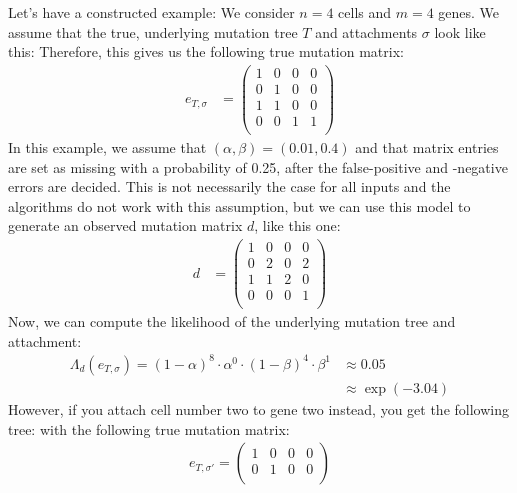 \begin{example}
    \label{exmpl:scite_problem}
    Let's have a constructed example: We consider $n = 4$ cells and $m = 4$ genes. We assume that the true, underlying mutation tree $T$ and attachments $\sigma$ look like this:
    Therefore, this gives us the following true mutation matrix:
    \begin{align*}
        e_{T, \sigma} &= \begin{pmatrix}
            1 & 0 & 0 & 0 \\
            0 & 1 & 0 & 0 \\
            1 & 1 & 0 & 0 \\
            0 & 0 & 1 & 1 \\
        \end{pmatrix}
    \end{align*}
    In this example, we assume that $(\alpha, \beta) = (0.01, 0.4)$ and that matrix entries are set as missing with a probability of 0.25, after the false-positive and -negative errors are decided. This is not necessarily the case for all inputs and the algorithms do not work with this assumption, but we can use this model to generate an observed mutation matrix $d$, like this one:
    \begin{align*}
        d &= \begin{pmatrix}
            1 & 0 & 0 & 0 \\
            0 & 2 & 0 & 2 \\
            1 & 1 & 2 & 0 \\
            0 & 0 & 0 & 1 \\
        \end{pmatrix}
    \end{align*}
    Now, we can compute the likelihood of the underlying mutation tree and attachment:
    \begin{align*}
        \Lambda_d(e_{T, \sigma}) = (1-\alpha)^{8} \cdot \alpha^{0} \cdot (1-\beta)^{4} \cdot \beta^{1} &\approx 0.05 \\
        &\approx \exp(-3.04)
    \end{align*}
    However, if you attach cell number two to gene two instead, you get the following tree:
    with the following true mutation matrix:
    \begin{align*}
        e_{T, \sigma'} = \begin{pmatrix}
            1 & 0 & 0 & 0 \\
            0 & 1 & 0 & 0 \\

\end{pmatrix}
\end{align*}
\end{example}
